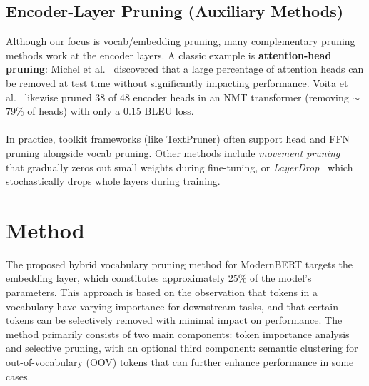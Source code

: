 \documentclass[twocolumn]{article}
\begin{document}
\subsection{Encoder-Layer Pruning (Auxiliary Methods)}

Although our focus is vocab/embedding pruning, many complementary pruning methods work at the encoder layers. A classic example is \textbf{attention-head pruning}: Michel et al.~\cite{michel2019sixteen} discovered that a large percentage of attention heads can be removed at test time without significantly impacting performance. Voita et al.~\cite{voita2019analyzing} likewise pruned 38 of 48 encoder heads in an NMT transformer (removing $\sim$79\% of heads) with only a 0.15 BLEU loss.
\\ \\
In practice, toolkit frameworks (like TextPruner) often support head and FFN pruning alongside vocab pruning. Other methods include \textit{movement pruning}~\cite{sanh2020movement} that gradually zeros out small weights during fine-tuning, or \textit{LayerDrop}~\cite{fan2020layerdrop} which stochastically drops whole layers during training.

\section{Method}

The proposed hybrid vocabulary pruning method for ModernBERT targets the embedding layer, which constitutes approximately 25\% of the model's parameters. This approach is based on the observation that tokens in a vocabulary have varying importance for downstream tasks, and that certain tokens can be selectively removed with minimal impact on performance. The method primarily consists of two main components: token importance analysis and selective pruning, with an optional third component: semantic clustering for out-of-vocabulary (OOV) tokens that can further enhance performance in some cases.
\\ \\
\end{document}
